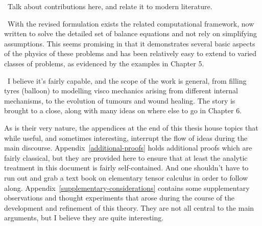 \textbullet\ 
 Talk about contributions here, and relate it to modern literature.

\textbullet\ 
 With the revised formulation exists the related computational
framework, now written to solve the detailed set of balance equations
and not rely on simplifying assumptions. This seems promising in that
it demonstrates several basic aspects of the physics of these problems
and has been relatively easy to extend to varied classes of problems,
as evidenced by the examples in Chapter 5.

\textbullet\ 
 I believe it's fairly capable, and the scope of the work is general,
from filling tyres (balloon) to modelling visco mechanics arising from
different internal mechanisms, to  the evolution of tumours and wound
healing. The story is brought to a close, along with many ideas on
where else to go in Chapter 6.

As is their very nature, the appendices at the end of this thesis
house topics that while useful, and sometimes interesting, interrupt
the flow of ideas during the main
discourse. Appendix~\ref{additional-proofs} holds additional proofs
which are fairly classical, but they are provided here to ensure that
at least the analytic treatment in this document is fairly
self-contained. And one shouldn't have to run out and grab a text book
on elementary tensor calculus in order to follow
along. Appendix~\ref{supplementary-considerations} contains some
supplementary observations and thought experiments that arose during
the course of the development and refinement of this theory. They are
not all central to the main arguments, but I believe they are quite
interesting.




